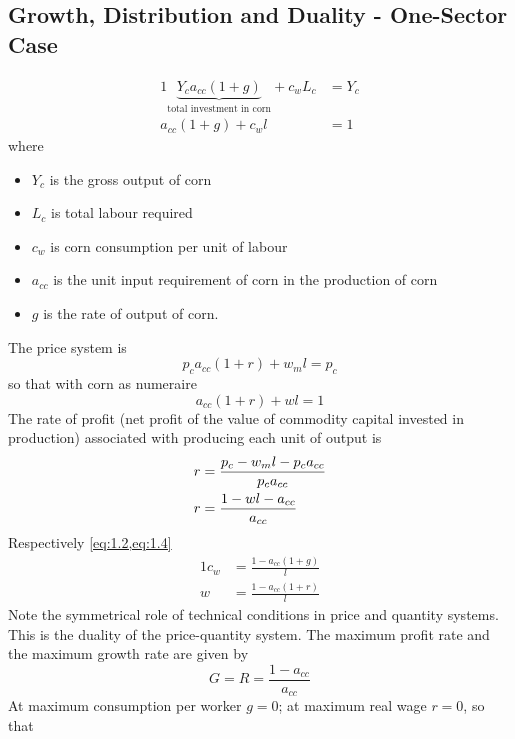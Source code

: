 \documentclass{article}
\begin{document}
\subsection{Growth, Distribution and Duality - One-Sector Case}
	\begin{alignat}{1}
		\underbrace{Y_c a_{cc}(1+g)}_{\text{total investment in corn}} + c_w L_c &= Y_c \label{eq:1.1}\\
		a_{cc} (1+g) + c_w l &= 1 \label{eq:1.2}
	\end{alignat}
	where
	\begin{itemize}
		\item \( Y_c \) is the gross output of corn
		\item \( L_c \) is total labour required
		\item \( c_w \) is corn consumption per unit of labour
		\item \( a_{cc} \) is the unit input requirement of corn in the production of corn 
		\item \( g \) is the rate of output of corn.
	\end{itemize}
	The price system is
	\begin{equation}
		p_c a_{cc} (1+r) + w_m l = p_c \label{eq:1.3}
	\end{equation}
	so that with corn as numeraire
	\begin{equation}
		a_{cc} (1+r) + wl = 1 \label{eq:1.4}
	\end{equation}
	The rate of profit (net profit of the value of commodity capital invested in production) associated with producing each unit of output is
	\begin{align}
		r &= \frac{p_c - w_m l - p_c a_{cc}}{p_c a_{cc}} \notag\\
		r &= \frac{1-wl-a_{cc}}{a_{cc}} 				 \label{eq:1.5}
	\end{align}
	Respectively \cref{eq:1.2,eq:1.4}
	\begin{alignat}{1}
		c_w &= \frac{1-a_{cc}(1+g)}{l} \label{eq:1.6}\\
		w   &= \frac{1-a_{cc}(1+r)}{l} \label{eq:1.7}
	\end{alignat}
	Note the symmetrical role of technical conditions in price and quantity systems. This is the duality of the price-quantity system. The maximum profit rate and the maximum growth rate are given by				
	\begin{equation}
		G = R = \frac{1-a_{cc}}{a_{cc}} \label{eq:1.8}
	\end{equation}
	At maximum consumption per worker \( g = 0 \); at maximum real wage \( r = 0 \), so that
\end{document}
